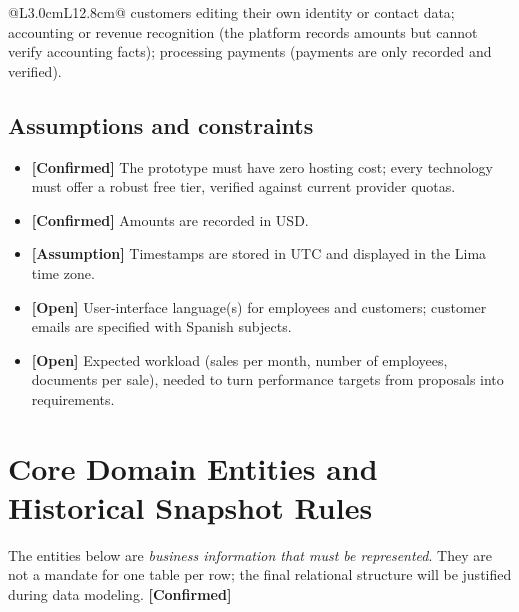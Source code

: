 \documentclass[11pt,a4paper]{article}
\newcommand{\tagconf}{\textcolor{green!45!black}{\textbf{[Confirmed]}}}
\newcommand{\tagassm}{\textcolor{blue!60!black}{\textbf{[Assumption]}}}
\newcommand{\tagopen}{\textcolor{red!70!black}{\textbf{[Open]}}}
\begin{document}
\begin{longtable}{@{}L{3.0cm}L{12.8cm}@{}}
	customers editing their own identity or contact data; accounting or revenue
	recognition (the platform records amounts but cannot verify accounting facts);
	processing payments (payments are only recorded and verified).                                                                                                                                                                                                                                                                                                                                                                                      \\
	\bottomrule
\end{longtable}

\subsection{Assumptions and constraints}

\begin{itemize}
	\item \tagconf{} The prototype must have zero hosting cost; every technology must offer a robust free tier, verified against current provider quotas.
	\item \tagconf{} Amounts are recorded in USD.
	\item \tagassm{} Timestamps are stored in UTC and displayed in the Lima time zone.
	\item \tagopen{} User-interface language(s) for employees and customers; customer emails are specified with Spanish subjects.
	\item \tagopen{} Expected workload (sales per month, number of employees, documents per sale), needed to turn performance targets from proposals into requirements.
\end{itemize}

\section{Core Domain Entities and Historical Snapshot Rules}

The entities below are \emph{business information that must be represented}.
They are not a mandate for one table per row; the final relational structure
will be justified during data modeling. \tagconf{}
\end{document}
